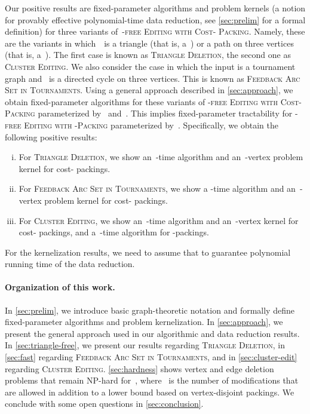 \documentclass[envcountsame,numbook,smallextended]{svjour3}
\newcommand{\shorten}[1]{}
\numberwithin{equation}{section}
\numberwithin{figure}{section}
\newcommand{\ffedv}{\textsc{-free Editing with -Packing}}
\newcommand{\tffedv}{\textsc{-free Editing with Cost- Packing}}
\begin{document}
  Our positive results are fixed-parameter algorithms and problem kernels (a notion for provably effective polynomial-time data reduction, see \cref{sec:prelim} for a formal definition) for three variants of~\tffedv{}.  Namely, these are the variants in which~~is a triangle (that is, a~) or a
path on three vertices (that is, a~). The first case is known as
\textsc{Triangle Deletion}, the second one as \textsc{Cluster
  Editing}.  We also consider the case in which the input is a
tournament graph and~ is a directed cycle on three vertices. This
is known as \textsc{Feedback Arc Set in Tournaments}.
Using a general approach described in \cref{sec:approach}, we obtain fixed-parameter algorithms for these variants of \tffedv{} parameterized by~ and~.  This implies fixed-parameter tractability for \ffedv{} parameterized by~.  Specifically, we obtain the following positive results:
\shorten{Applying this framework plus some problem-specific data reduction and
branching rules yields the following particular results:}
\begin{enumerate}[(i)]
\item For \textsc{Triangle Deletion}, we show an~-time algorithm and an~-vertex problem kernel for cost- packings.
\item For \textsc{Feedback Arc Set in Tournaments}, we show a
  -time algorithm and
  an~-vertex problem kernel for cost- packings.
\item For \textsc{Cluster Editing}, we show an~-time algorithm and an~-vertex kernel for cost- packings, and a~-time algorithm for -packings.
\end{enumerate}
For the kernelization results, we need to assume that 
to guarantee polynomial running time of the data reduction. 

\paragraph{Organization of this work.}
In \cref{sec:prelim}, we introduce basic graph-theoretic notation and formally define fixed-parameter algorithms and problem kernelization.  In \cref{sec:approach}, we present the general approach used in our algorithmic and data reduction results.  In \cref{sec:triangle-free}, we present our results regarding \textsc{Triangle Deletion}, in \cref{sec:fast} regarding \textsc{Feedback Arc Set in Tournaments}, and in \cref{sec:cluster-edit} regarding \textsc{Cluster Editing}.  \cref{sec:hardness} shows vertex and edge deletion problems that remain NP-hard for~, where ~is the number of modifications that are allowed in addition to a lower bound based on vertex-disjoint packings.  We conclude with some open questions in \cref{sec:conclusion}.
\end{document}
